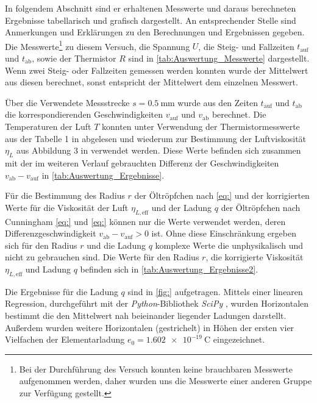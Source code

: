 In folgendem Abschnitt sind er erhaltenen Messwerte und daraus berechneten
Ergebnisse tabellarisch und grafisch dargestellt.
An entsprechender Stelle sind Anmerkungen und Erklärungen zu den Berechnungen 
und Ergebnissen gegeben.\\

Die Messwerte\footnote{Bei der Durchführung des Versuch konnten keine brauchbaren
Messwerte aufgenommen werden, daher wurden uns die Messwerte einer anderen Gruppe zur 
Verfügung gestellt.} zu diesem Versuch, die Spannung $U$, die Steig- und Fallzeiten $t_{\text{auf}}$ und 
$t_{\text{ab}}$, sowie der Thermistor $R$ sind in \cref{tab:Auswertung_Messwerte} dargestellt. 
Wenn zwei Steig- oder Fallzeiten gemessen werden konnten wurde der Mittelwert aus diesen berechnet,
sonst entspricht der Mittelwert dem einzelnen Messwert.
 
 
 



Über die Verwendete Messstrecke $s = \SI{0.5}{\mm}$ wurde aus den Zeiten $t_{\text{auf}}$ und $t_{\text{ab}}$ die
korrespondierenden Geschwindigkeiten $v_{\text{auf}}$ und $v_{\text{ab}}$ berechnet. Die Temperaturen der Luft 
$T$ konnten unter Verwendung der Thermistormesswerte aus der Tabelle 1 in \cite{V503} abgelesen und
wiederum zur Bestimmung der Luftviskosität $\eta_{L}$ aus Abbildung 3 in \cite{V503} verwendet werden.
Diese Werte befinden sich zusammen mit der im weiteren Verlauf gebrauchten Differenz der Geschwindigkeiten 
$v_{\text{ab}} - v_{\text{auf}}$ in \cref{tab:Auswertung_Ergebnisse}.  
 
	

Für die Bestimmung des Radius $r$ der Öltröpfchen nach \cref{eq:} und der korrigierten Werte für 
die Viskosität der Luft $\eta_{L,\text{eff}}$  und der Ladung $q$ der Öltröpfchen nach Cunningham \cref{eq:} und \cref{eq:} 
können nur die Werte verwendet werden, deren Differenzgeschwindigkeit $v_{\text{ab}} - v_{\text{auf}} > 0$ ist.
Ohne diese Einschränkung ergeben sich für den Radius $r$ und die Ladung $q$ komplexe Werte die unphysikalisch und 
nicht zu gebrauchen sind.
Die Werte für den Radius $r$, die korrigierte Viskosität $\eta_{L, \text{eff}}$ und Ladung $q$  befinden sich in 
\cref{tab:Auswertung_Ergebnisse2}.

	     
	 
Die Ergebnisse für die Ladung $q$ sind in \cref{fig:} aufgetragen. Mittels einer linearen Regression,
durchgeführt mit der \emph{Python}-Bibliothek \emph{SciPy} \cite{SciPy},
wurden Horizontalen bestimmt die den Mittelwert nah beieinander liegender Ladungen darstellt.
Außerdem wurden weitere Horizontalen (gestrichelt) in Höhen der ersten vier Vielfachen der
Elementarladung $e_{0} = \SI{1.602e-19}{\coulomb}$ \cite{Mende09} eingezeichnet.


